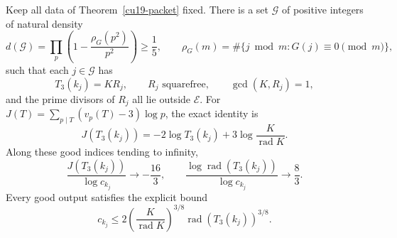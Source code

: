 \begin{theorem}
\label{cu19-density}
Keep all data of Theorem~\ref{cu19-packet} fixed. There is a set
\(\mathcal G\) of positive integers of natural density
\[
 d(\mathcal G)=\prod_p\left(1-\frac{\rho_G(p^2)}{p^2}\right)
 \ge\frac15,\qquad
 \rho_G(m)=\#\{j\bmod m:G(j)\equiv0\pmod m\},
\]
such that each \(j\in\mathcal G\) has
\[
 T_3(k_j)=KR_j,\qquad R_j\text{ squarefree},\qquad
 \gcd(K,R_j)=1,
\]
and the prime divisors of \(R_j\) all lie outside \(\mathcal E\).
For \(J(T)=\sum_{p\mid T}(v_p(T)-3)\log p\), the exact identity is
\begin{equation}
 J(T_3(k_j))=-2\log T_3(k_j)+3\log\frac K{\operatorname{rad}K}.
 \label{cu19-signed}
\end{equation}
Along these good indices tending to infinity,
\[
 \frac{J(T_3(k_j))}{\log c_{k_j}}\longrightarrow-\frac{16}{3},
 \qquad
 \frac{\log\operatorname{rad}(T_3(k_j))}{\log c_{k_j}}
 \longrightarrow\frac83.
\]
Every good output satisfies the explicit bound
\begin{equation}
 c_{k_j}\le
 2\left(\frac K{\operatorname{rad}K}\right)^{3/8}
 \operatorname{rad}(T_3(k_j))^{3/8}.
 \label{cu19-radical}
\end{equation}
\end{theorem}
